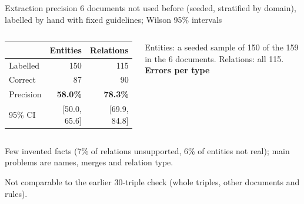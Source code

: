 \documentclass[aspectratio=169,11pt]{beamer}
\begin{document}
\begin{frame}{Extraction precision}
\footnotesize
6 documents not used before (seeded, stratified by domain), labelled by hand with fixed guidelines; Wilson 95\% intervals %
\vspace{1mm}

\begin{columns}[T]
\centering
\vspace{2mm}
\begin{tabular}{@{}lrr@{}}
\toprule
 & Entities & Relations \\
\midrule
Labelled & 150 & 115 \\
Correct & 87 & 90 \\
Precision & \textbf{58.0\%} & \textbf{78.3\%} \\
95\% CI & [50.0, 65.6] & [69.9, 84.8] \\
\bottomrule
\end{tabular}

\vspace{2mm}
\raggedright\scriptsize
Entities: a seeded sample of 150 of the 159 in the 6 documents. Relations: all 115.
\textbf{Errors per type}\\[2pt]
\end{columns}

\vspace{1mm}
\small
Few invented facts (7\% of relations unsupported, 6\% of entities not real); main problems are names, merges and relation type.

\vspace{1mm}
\scriptsize\color{muted}
Not comparable to the earlier 30-triple check (whole triples, other documents and rules).
\end{frame}
\end{document}
